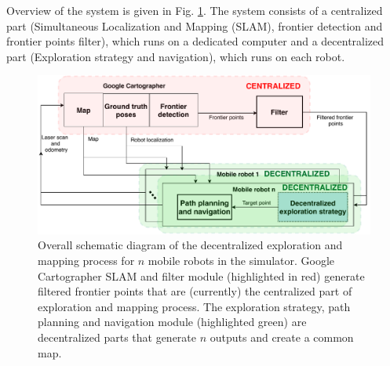 Overview of the system is given in Fig. \ref{fig:exploration-strategy}. The system consists of a centralized part (Simultaneous Localization and Mapping (SLAM), frontier detection and frontier points filter), which runs on a dedicated computer and a decentralized part (Exploration strategy and navigation), which runs on each robot. 

\begin{figure}[t!]
	\centering\includegraphics[width=1.0\columnwidth]{./pictures/diagram_exploration.pdf}
	\caption{Overall schematic diagram of the decentralized exploration and mapping process for $n$ mobile robots in the simulator. Google Cartographer SLAM and filter module (highlighted in red) generate filtered frontier points that are (currently) the centralized part of exploration and mapping process. The exploration strategy, path planning and navigation module (highlighted green) are decentralized parts that generate $n$ outputs and create a common map.}
	\label{fig:exploration-strategy}
\end{figure}




